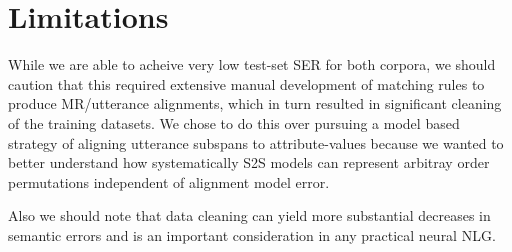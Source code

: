 \section{Limitations}

While we are able to acheive very low test-set SER for both corpora, we 
should caution that this required extensive manual development of matching 
rules to produce MR/utterance alignments, which in turn resulted in 
significant cleaning of the training datasets. We chose to do this over 
pursuing a model based strategy of aligning utterance subspans to 
attribute-values %
because we wanted to better understand how systematically S2S models can
represent arbitray order permutations independent of alignment model error. 


Also we should note that 
data cleaning can yield more substantial decreases in
semantic errors \cite{dusek2019,hongminwang2019} and is an important 
consideration in any practical neural NLG.
